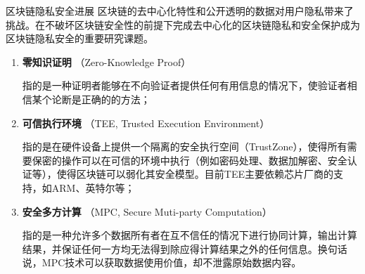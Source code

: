 \documentclass[11pt]{beamer}
\begin{document}
\begin{frame}{区块链隐私安全进展}
	区块链的去中心化特性和公开透明的数据对用户隐私带来了挑战。在不破坏区块链安全性的前提下完成去中心化的区块链隐私和安全保护成为区块链隐私安全的重要研究课题。

	\begin{enumerate}
		\item \textbf{零知识证明} （Zero-Knowledge Proof）

		      {\scriptsize 指的是一种证明者能够在不向验证者提供任何有用信息的情况下，使验证者相信某个论断是正确的的方法；}

		\item \textbf{可信执行环境} （TEE, Trusted Execution Environment）

		      {\scriptsize 	指的是在硬件设备上提供一个隔离的安全执行空间（TrustZone），使得所有需要保密的操作可以在可信的环境中执行（例如密码处理、数据加解密、安全认证等），使得区块链可以弱化其安全模型。目前TEE主要依赖芯片厂商的支持，如ARM、英特尔等；}

		\item \textbf{安全多方计算} （MPC, Secure Muti-party Computation）

		      {\scriptsize 	指的是一种允许多个数据所有者在互不信任的情况下进行协同计算，输出计算结果，并保证任何一方均无法得到除应得计算结果之外的任何信息。换句话说，MPC技术可以获取数据使用价值，却不泄露原始数据内容。}
	\end{enumerate}
\end{frame}
\end{document}

